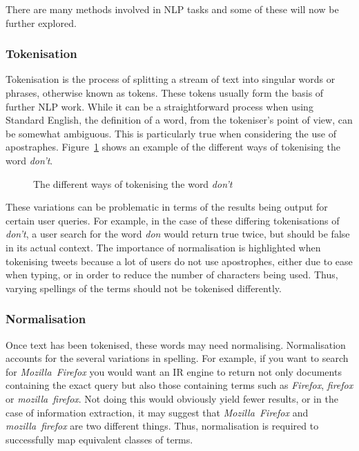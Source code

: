 There are many methods involved in NLP tasks and some of these will now be further explored.

\subsubsection{Tokenisation}
Tokenisation is the process of splitting a stream of text into singular words or phrases, otherwise known as tokens. These tokens usually form the basis of further NLP work. While it can be a straightforward process when using Standard English, the definition of a word, from the tokeniser's point of view, can be somewhat ambiguous. This is particularly true when considering the use of apostraphes. Figure~\ref{fig:tokenisation} shows an example of the different ways of tokenising the word \emph{don't}.

\begin{figure}[h!]
  \centering
  
  \caption{The different ways of tokenising the word \emph{don't}
    \label{fig:tokenisation}}
\end{figure}

These variations can be problematic in terms of the results being output for certain user queries. For example, in the case of these differing tokenisations of \emph{don't}, a user search for the word \emph{don} would return true twice, but should be false in its actual context. The importance of normalisation is highlighted when tokenising tweets because a lot of users do not use apostrophes, either due to ease when typing, or in order to reduce the number of characters being used. Thus, varying spellings of the terms should not be tokenised differently.

\subsubsection{Normalisation}
Once text has been tokenised, these words may need normalising. Normalisation accounts for the several variations in spelling. For example, if you want to search for \emph{Mozilla~Firefox} you would want an IR engine to return not only documents containing the exact query but also those containing terms such as \emph{Firefox}, \emph{firefox} or \emph{mozilla~firefox}. Not doing this would obviously yield fewer results, or in the case of information extraction, it may suggest that \emph{Mozilla~Firefox} and \emph{mozilla~firefox} are two different things. Thus, normalisation is required to successfully map equivalent classes of terms.

